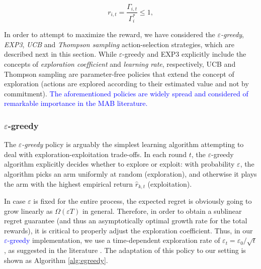\documentclass[preprint,12pt]{elsarticle}
\begin{document}
	\begin{equation}
	r_{i,t} = {\frac{\Gamma_{i,t}}{{\Gamma_{i}^*}}} \leq 1,
	\label{eq:reward_generation}
	\nonumber
	\end{equation}
	
	In order to attempt to maximize the reward, we have considered the \emph{$\varepsilon$-greedy}, \emph{EXP3}, \emph{UCB} and \emph{Thompson sampling} action-selection strategies, which are described next in this section. While $\varepsilon$-greedy and EXP3 explicitly include the concepts of \emph{exploration coefficient} and \emph{learning rate}, respectively, UCB and Thompson sampling are parameter-free policies that extend the concept of exploration (actions are explored according to their estimated value and not by commitment). \textcolor{blue}{The aforementioned policies are widely spread and considered of remarkable importance in the MAB literature.} 
	
	\subsubsection{$\varepsilon$-greedy}
	\label{section:bandits_egreedy}	
	The \emph{$\varepsilon$-greedy} policy \cite{sutton1998reinforcement,auer2002finite} is arguably the simplest learning algorithm attempting to deal with exploration-exploitation trade-offs. In each round $t$, the $\varepsilon$-greedy algorithm explicitly decides whether to explore or exploit: with probability $\varepsilon$, the algorithm picks an arm uniformly at random (exploration), and otherwise it plays the arm with the highest empirical return $\hat{r}_{k,t}$ (exploitation). 
	
	In case $\varepsilon$ is fixed for the entire process, the expected regret is obviously going to grow linearly as $\Omega\left(\varepsilon T\right)$ in general. Therefore, in order to obtain a sublinear regret guarantee (and thus an asymptotically optimal growth rate for the total rewards), it is critical to properly adjust the exploration coefficient. Thus, in our \textcolor{blue}{$\varepsilon$-greedy} implementation, we use a time-dependent exploration rate of $\varepsilon_t = \varepsilon_0 / \sqrt{t}$, as suggested in the literature \cite{auer2002finite}. The adaptation of this policy to our setting is shown as Algorithm \ref{alg:egreedy}.
	
\end{document}
